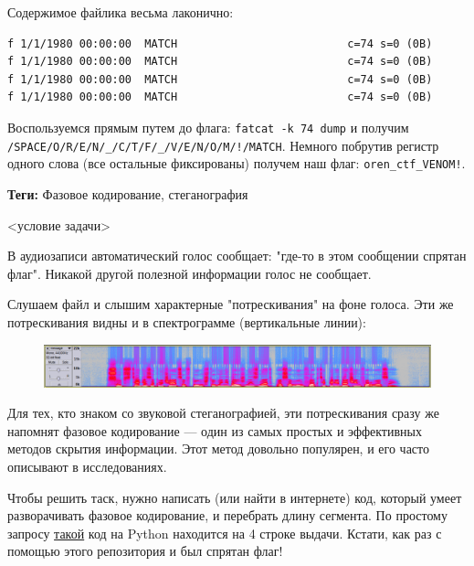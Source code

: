 \documentclass[idxtotoc,hyperref,openany,oneside]{files/forensics} %
\begin{document}
Содержимое файлика весьма лаконично:
\begin{lstlisting}
f 1/1/1980 00:00:00  MATCH                          c=74 s=0 (0B)
f 1/1/1980 00:00:00  MATCH                          c=74 s=0 (0B)
f 1/1/1980 00:00:00  MATCH                          c=74 s=0 (0B)
f 1/1/1980 00:00:00  MATCH                          c=74 s=0 (0B)
\end{lstlisting}

Воспользуемся прямым путем до флага: \verb|fatcat -k 74 dump| и получим \newline \verb|/SPACE/O/R/E/N/_/C/T/F/_/V/E/N/O/M/!/MATCH|. Немного побрутив регистр одного слова (все остальные фиксированы) получем наш флаг: \verb|oren_ctf_VENOM!|.
\newpage



\textbf{Теги:} Фазовое кодирование, стеганография\vspace{\baselineskip}

\begin{tcolorbox}
<условие задачи>
\end{tcolorbox}

В аудиозаписи автоматический голос сообщает: "где-то в этом сообщении спрятан флаг". Никакой другой полезной информации голос не сообщает.

Слушаем файл и слышим характерные "потрескивания" на фоне голоса. Эти же потрескивания видны и в спектрограмме (вертикальные линии):
\begin{figure}[H]
\begin{center}
\includegraphics[width=1.0\linewidth]{files/spectrogram}
\end{center}
\label{fig:spectrogram}
\end{figure}

Для тех, кто знаком со звуковой стеганографией, эти потрескивания сразу же напомнят фазовое кодирование — один из самых простых и эффективных методов скрытия информации. Этот метод довольно популярен, и его часто описывают в исследованиях.

Чтобы решить таск, нужно написать (или найти в интернете) код, который умеет разворачивать фазовое кодирование, и перебрать длину сегмента. По простому запросу \href{https://github.com/Galarius/py-stego-phase}{такой} код на Python находится на 4 строке выдачи. Кстати, как раз с помощью этого репозитория и был спрятан флаг!
\end{document}
